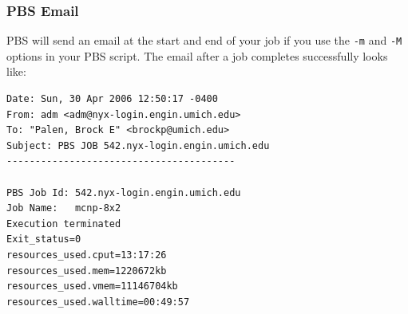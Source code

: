 \documentclass{beamer}
\begin{document}
\begin{frame}[fragile]
 \frametitle{PBS Email}
PBS will send an email at the start and end of your job if you use the
\texttt{-m} and \texttt{-M} options in your PBS script.  The email after a job
completes successfully looks like:
\tiny
\begin{verbatim}
Date: Sun, 30 Apr 2006 12:50:17 -0400
From: adm <adm@nyx-login.engin.umich.edu>
To: "Palen, Brock E" <brockp@umich.edu>
Subject: PBS JOB 542.nyx-login.engin.umich.edu
----------------------------------------

PBS Job Id: 542.nyx-login.engin.umich.edu
Job Name:   mcnp-8x2
Execution terminated
Exit_status=0
resources_used.cput=13:17:26
resources_used.mem=1220672kb
resources_used.vmem=11146704kb
resources_used.walltime=00:49:57
\end{verbatim}
\normalsize
\end{frame}
\end{document}
